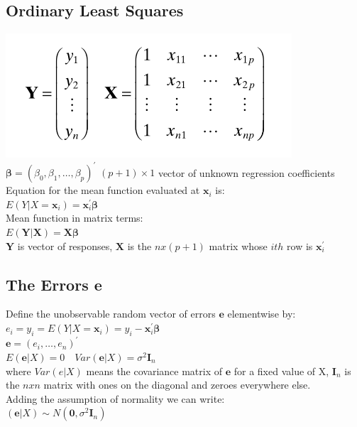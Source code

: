 \documentclass[openany]{book}
\newcommand{\B}{\beta}
\newcommand{\sg}{\sigma}
\numberwithin{equation}{section}
\begin{document}
\begin{flushleft}
\section{Ordinary Least Squares}
\includegraphics[scale=.7]{matnot.png}\\
$\boldsymbol{\B}=(\B_0,\B_1,\dots,\B_p)^{'}$  $(p+1)\times1$ vector of unknown regression coefficients\\
Equation for the mean function evaluated at $\bm{x}_i$ is:\\ $E(Y|X=\boldsymbol{x}_i)=\boldsymbol{x}_i^{'}\bm{\B}$\\
Mean function in matrix terms:\\
$E(\bm{Y}|\bm{X})=\bm{X}\bm{\B}$\\
$\bm{Y}$ is vector of responses, $\bm{X}$ is the $nx(p+1)$ matrix whose $ith$ row is $\bm{x}_i^{'}$
\subsection{The Errors e}
Define the unobservable random vector of errors $\bm{e}$ elementwise by:\\
$e_i=y_i=E(Y|X=\bm{x}_i)=y_i-\bm{x}_i^{'}\bm{\B}$\\
$\bm{e}=(e_i,\dots,e_n)^{'}$\\
$E(\bm{e}|X)=0 \quad Var(\bm{e}|X)=\sg^2\bm{I}_n$\\
where $Var(e|X)$ means the covariance matrix of $\bm{e}$ for a fixed value of X, $\bm{I}_n$ is the $nxn$ matrix with ones on the diagonal and zeroes everywhere else.\\
Adding the assumption of normality we can write:\\
$(\bm{e}|X)\sim N(\bm{0},\sg^2\bm{I}_n)$\\

\end{flushleft}
\end{document}
